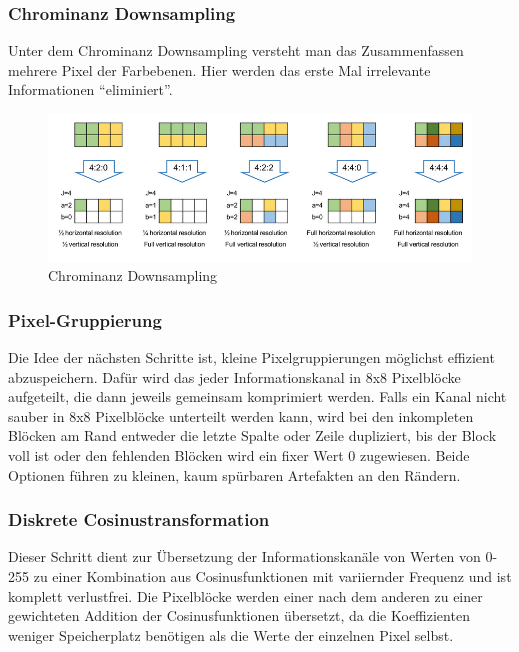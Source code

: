 \documentclass{article}
\begin{document}
\subsubsection{Chrominanz Downsampling}
Unter dem Chrominanz Downsampling versteht man das Zusammenfassen mehrere Pixel der Farbebenen. Hier werden das erste Mal irrelevante Informationen ``eliminiert''. 
\begin{figure}[h]
		\begin{center}
		\includegraphics[width=\linewidth]{img/downsampling.png}
		\end{center}
		\caption{Chrominanz Downsampling}
		\label{fig:Chrominanz Downsampling}
\end{figure}
\subsubsection{Pixel-Gruppierung}
Die Idee der nächsten Schritte ist, kleine Pixelgruppierungen möglichst effizient abzuspeichern. Dafür wird das jeder Informationskanal in 8x8 Pixelblöcke aufgeteilt, die dann jeweils gemeinsam komprimiert werden. Falls ein Kanal nicht sauber in 8x8 Pixelblöcke unterteilt werden kann, wird bei den inkompleten Blöcken am Rand entweder die letzte Spalte oder Zeile dupliziert, bis der Block voll ist oder den fehlenden Blöcken wird ein fixer Wert 0 zugewiesen. Beide Optionen führen zu kleinen, kaum spürbaren Artefakten an den Rändern.
\newpage
\subsubsection{Diskrete Cosinustransformation}
Dieser Schritt dient zur Übersetzung der Informationskanäle von Werten von 0-255 zu einer Kombination aus Cosinusfunktionen mit variiernder Frequenz und ist komplett verlustfrei. 
Die Pixelblöcke werden einer nach dem anderen zu einer gewichteten Addition der Cosinusfunktionen übersetzt, da die Koeffizienten weniger Speicherplatz benötigen als die Werte der einzelnen Pixel selbst.
\end{document}
